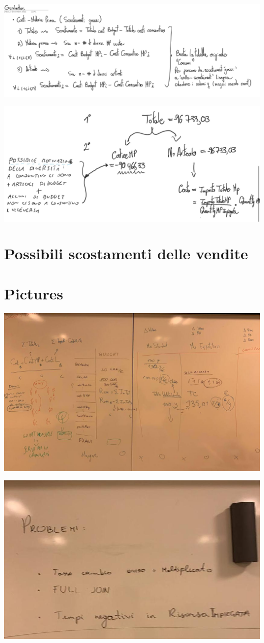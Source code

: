 \documentclass{article}
\begin{document}
\includegraphics[scale = 0.25]{Scostamenti1.jpg}

\includegraphics[scale = 0.25]{Scostamenti2.jpg}
\section{Possibili scostamenti delle vendite}


\section{Pictures}
\includegraphics[scale = 0.25]{Lavagna1.jpg}

\includegraphics[scale = 0.25]{Lavagna2.jpg}
\end{document}
